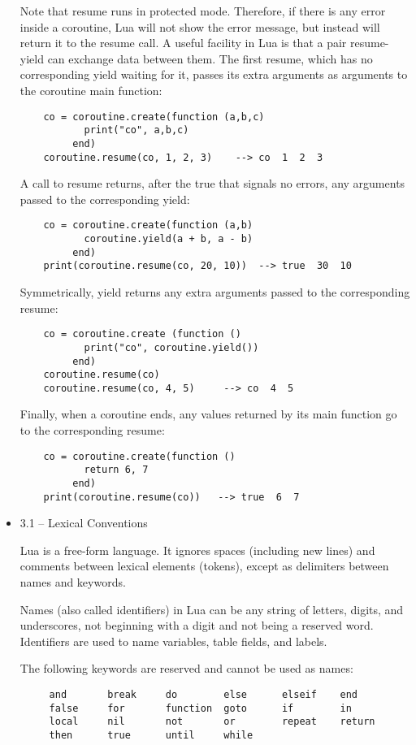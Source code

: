 \begin{itemize}
Note that resume runs in protected mode. Therefore, if there is any error inside a coroutine, Lua will not show the error message, but instead will return it to the resume call.
A useful facility in Lua is that a pair resume-yield can exchange data between them. The first resume, which has no corresponding yield waiting for it, passes its extra arguments as arguments to the coroutine main function:
\begin{lstlisting}
    co = coroutine.create(function (a,b,c)
           print("co", a,b,c)
         end)
    coroutine.resume(co, 1, 2, 3)    --> co  1  2  3
\end{lstlisting}

A call to resume returns, after the true that signals no errors, any arguments passed to the corresponding yield:
\begin{lstlisting}
    co = coroutine.create(function (a,b)
           coroutine.yield(a + b, a - b)
         end)
    print(coroutine.resume(co, 20, 10))  --> true  30  10
\end{lstlisting}

Symmetrically, yield returns any extra arguments passed to the corresponding resume:
\begin{lstlisting}
    co = coroutine.create (function ()
           print("co", coroutine.yield())
         end)
    coroutine.resume(co)
    coroutine.resume(co, 4, 5)     --> co  4  5
\end{lstlisting}

Finally, when a coroutine ends, any values returned by its main function go to the corresponding resume:
\begin{lstlisting}
    co = coroutine.create(function ()
           return 6, 7
         end)
    print(coroutine.resume(co))   --> true  6  7
\end{lstlisting}

\item 3.1 – Lexical Conventions

Lua is a free-form language. It ignores spaces (including new lines) and comments between lexical elements (tokens), except as delimiters between names and keywords.

Names (also called identifiers) in Lua can be any string of letters, digits, and underscores, not beginning with a digit and not being a reserved word. Identifiers are used to name variables, table fields, and labels.

The following keywords are reserved and cannot be used as names:
\begin{lstlisting}
     and       break     do        else      elseif    end
     false     for       function  goto      if        in
     local     nil       not       or        repeat    return
     then      true      until     while
\end{lstlisting}


\end{itemize}
